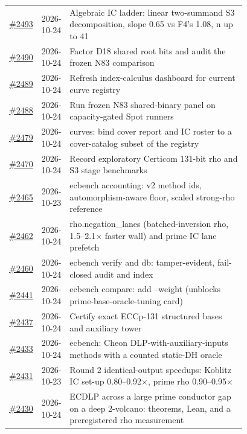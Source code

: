 {\begin{longtable}{@{}r l >{\raggedright\arraybackslash}p{0.78\linewidth}@{}}
\href{https://github.com/aburan28/crypto/pull/2493}{\#2493} & 2026-10-24 & Algebraic IC ladder: linear two-summand S3 decomposition, slope 0.65 vs F4's 1.08, n up to 41\\
\href{https://github.com/aburan28/crypto/pull/2490}{\#2490} & 2026-10-24 & Factor D18 shared root bits and audit the frozen N83 comparison\\
\href{https://github.com/aburan28/crypto/pull/2489}{\#2489} & 2026-10-24 & Refresh index-calculus dashboard for current curve registry\\
\href{https://github.com/aburan28/crypto/pull/2488}{\#2488} & 2026-10-24 & Run frozen N83 shared-binary panel on capacity-gated Spot runners\\
\href{https://github.com/aburan28/crypto/pull/2479}{\#2479} & 2026-10-24 & curves: bind cover report and IC roster to a cover-catalog subset of the registry\\
\href{https://github.com/aburan28/crypto/pull/2470}{\#2470} & 2026-10-24 & Record exploratory Certicom 131-bit rho and S3 stage benchmarks\\
\href{https://github.com/aburan28/crypto/pull/2465}{\#2465} & 2026-10-23 & ecbench accounting: v2 method ids, automorphism-aware floor, scaled strong-rho reference\\
\href{https://github.com/aburan28/crypto/pull/2462}{\#2462} & 2026-10-24 & rho.negation\_\allowbreak{}lanes (batched-inversion rho, 1.5--2.1$\times$ faster wall) and prime IC lane prefetch\\
\href{https://github.com/aburan28/crypto/pull/2460}{\#2460} & 2026-10-24 & ecbench verify and db: tamper-evident, fail-closed audit and index\\
\href{https://github.com/aburan28/crypto/pull/2441}{\#2441} & 2026-10-24 & ecbench compare: add --weight (unblocks prime-base-oracle-tuning card)\\
\href{https://github.com/aburan28/crypto/pull/2437}{\#2437} & 2026-10-24 & Certify exact ECCp-131 structured bases and auxiliary tower\\
\href{https://github.com/aburan28/crypto/pull/2433}{\#2433} & 2026-10-24 & ecbench: Cheon DLP-with-auxiliary-inputs methods with a counted static-DH oracle\\
\href{https://github.com/aburan28/crypto/pull/2431}{\#2431} & 2026-10-23 & Round 2 identical-output speedups: Koblitz IC set-up 0.80--0.92$\times$, prime rho 0.90--0.95$\times$\\
\href{https://github.com/aburan28/crypto/pull/2430}{\#2430} & 2026-10-24 & ECDLP across a large prime conductor gap on a deep 2-volcano: theorems, Lean, and a preregistered rho measurement\\

\end{longtable}}
